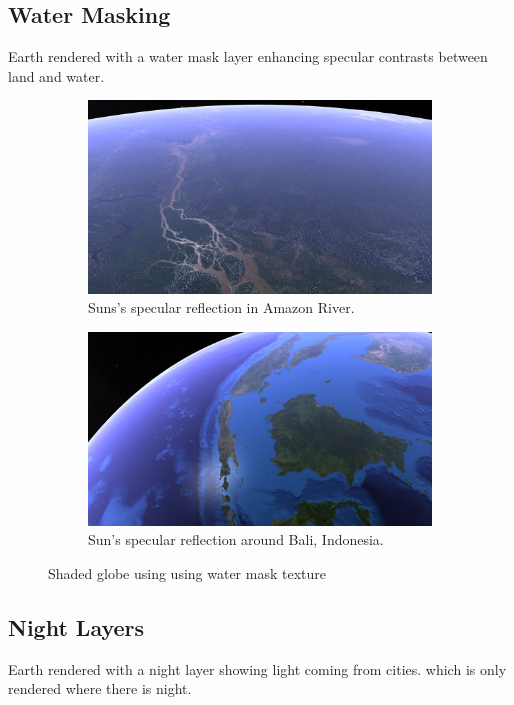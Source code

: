 \subsection{Water Masking}
\FloatBarrier
Earth rendered with a water mask layer enhancing specular contrasts between land and water.
\begin{figure}[h]
    \centering
    \begin{subfigure}[bt]{0.9\textwidth}
        \includegraphics[width=\textwidth]{figures/results/screenshots/specular_brazil.png}
        \caption{Suns's specular reflection in Amazon River.}
    \end{subfigure}
    \begin{subfigure}[bt]{0.9\textwidth}
        \includegraphics[width=\textwidth]{figures/results/screenshots/specular_indonesia.png}
        \caption{Sun's specular reflection around Bali, Indonesia.}
    \end{subfigure}
    \caption{Shaded globe using using water mask texture}
\end{figure}


\clearpage
\subsection{Night Layers}
\FloatBarrier
Earth rendered with a night layer showing light coming from cities. which is only rendered where there is night. 

